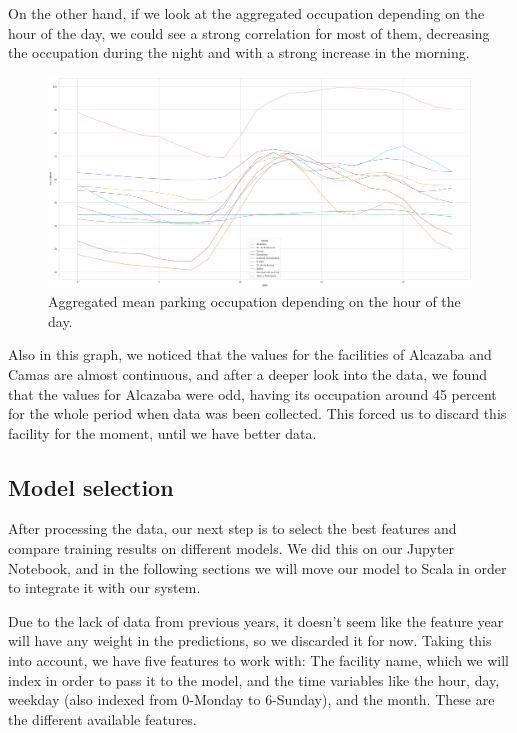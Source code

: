 On the other hand, if we look at the aggregated occupation depending on the hour of the day, we could see a strong correlation for most of them, decreasing the occupation during the night and with a strong increase in the morning.

\begin{figure}[H]
	\centering
	\includegraphics[width=0.9\linewidth]{imagenes/aggregated-mean-occupation-hour.png}
	\caption{Aggregated mean parking occupation depending on the hour of the day.}
	\label{aggregated-mean-occupation-hour}
\end{figure}

Also in this graph, we noticed that the values for the facilities of Alcazaba and Camas are almost continuous, and after a deeper look into the data, we found that the values for Alcazaba were odd, having its occupation around 45 percent for the whole period when data was been collected. This forced us to discard this facility for the moment, until we have better data.

\clearpage

\subsection{Model selection}

After processing the data, our next step is to select the best features and compare training results on different models. We did this on our Jupyter Notebook, and in the following sections we will move our model to Scala in order to integrate it with our system.

Due to the lack of data from previous years, it doesn't seem like the feature year will have any weight in the predictions, so we discarded it for now. Taking this into account, we have five features to work with: The facility name, which we will index in order to pass it to the model, and the time variables like the hour, day, weekday (also indexed from 0-Monday to 6-Sunday), and the month. These are the different available features.


